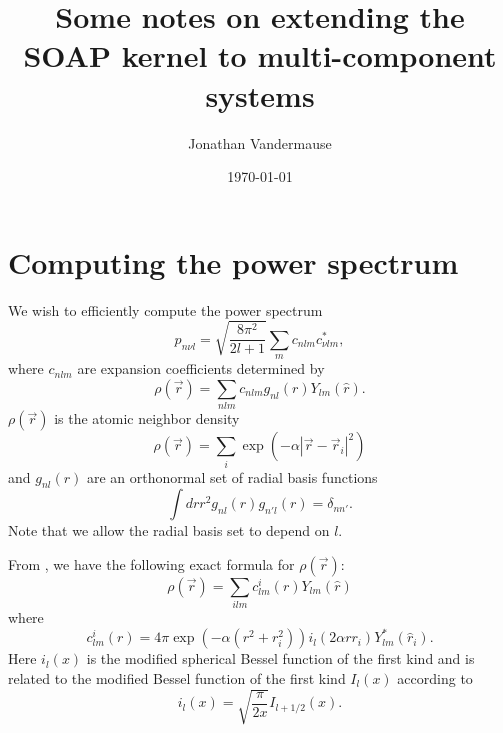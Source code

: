 \documentclass[%
preprint,
amsmath,amssymb,
aps,
]{revtex4-1}
\begin{document}
\title{Some notes on extending the SOAP kernel to multi-component systems}

\author{Jonathan Vandermause}

\date{\today}


\maketitle

\section{Computing the power spectrum}
We wish to efficiently compute the power spectrum
\begin{equation}
p_{n \nu l} = \sqrt{\frac{8\pi^2}{2l+1}} \sum_m c_{nlm}c^*_{\nu l m},
\end{equation}
where $c_{nlm}$ are expansion coefficients determined by
\begin{equation}
    \rho(\vec{r}) = \sum_{nlm} c_{nlm} g_{nl}(r) Y_{lm}(\hat{r}).
\end{equation}
$\rho(\vec{r})$ is the atomic neighbor density
\begin{equation}
    \rho(\vec{r}) = \sum_i \exp(-\alpha |\vec{r} - \vec{r}_i|^2)
\end{equation}
and $g_{nl}(r)$ are an orthonormal set of radial basis functions
\begin{equation}
    \int dr r^2 g_{nl}(r) g_{n' l}(r) = \delta_{n n'}.
\end{equation}
Note that we allow the radial basis set to depend on $l$.


From \cite{bartok2013representing}, we have the following exact formula for $\rho(\vec{r})$:
\begin{equation}
    \rho(\vec{r}) = \sum_{ilm} c_{lm}^i(r) Y_{lm}(\hat{r})
\end{equation}
where
\begin{equation}
    c_{lm}^i(r) = 4\pi \exp(-\alpha(r^2+r_i^2)) i_l (2\alpha r r_i) Y_{lm}^*(\hat{r}_i).
\end{equation}
Here $i_l(x)$ is the modified spherical Bessel function of the first kind and is related to the modified Bessel function of the first kind $I_l(x)$ according to
\begin{equation}
    i_l(x) = \sqrt{\frac{\pi}{2 x}} I_{l+1/2}(x).
\end{equation}
\end{document}
